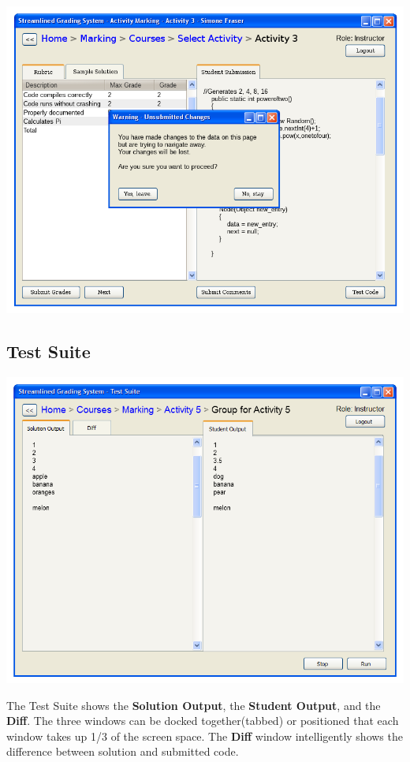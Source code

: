 \documentclass{article}
\begin{document}
\begin{center}
  \includegraphics[scale=0.55]{../images/UIMockups/PNG_Renders/activityMarkingWarning}
\end{center}

\subsection{Test Suite}
\begin{center}
\includegraphics[scale=0.55]{../images/UIMockups/PNG_Renders/SRS_TestSuite_Split}
\end{center}
The Test Suite shows the \textbf{Solution Output}, the \textbf{Student Output},
and the \textbf{Diff}.
The three windows can be docked together(tabbed) or positioned that each
window takes up 1/3 of the screen space.
The \textbf{Diff} window intelligently shows the difference between
solution and submitted code.
\end{document}
